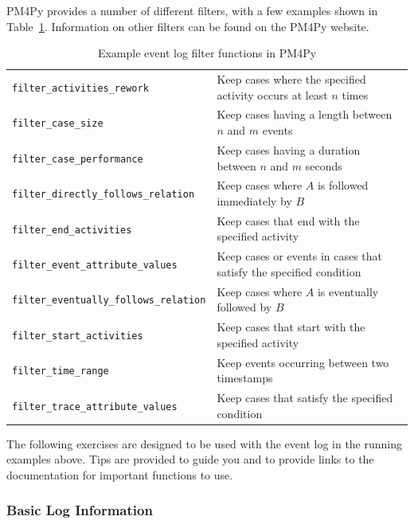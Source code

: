 \begin{withcode}
PM4Py provides a number of different filters, with a few examples shown in Table~\ref{tab:pm4py_filters}. Information on other filters can be found on the PM4Py website.

\begin{table}
\small
\renewcommand{\arraystretch}{1.25}
\begin{tabularx}{\textwidth}{l|X} \hline 
\texttt{filter\_activities\_rework} & Keep cases where the specified activity occurs at least $n$ times \\
\texttt{filter\_case\_size} & Keep cases having a length between $n$ and $m$ events \\
\texttt{filter\_case\_performance} & Keep cases having a duration between $n$ and $m$ seconds \\
\texttt{filter\_directly\_follows\_relation} & Keep cases where $A$ is followed immediately by $B$ \\
\texttt{filter\_end\_activities} & Keep cases that end with the specified activity \\
\texttt{filter\_event\_attribute\_values} & Keep cases or events in cases that satisfy the specified condition \\ 
\texttt{filter\_eventually\_follows\_relation} & Keep cases where $A$ is eventually followed by $B$ \\
\texttt{filter\_start\_activities} & Keep cases that start with the specified activity \\
\texttt{filter\_time\_range} & Keep events occurring between two timestamps \\
\texttt{filter\_trace\_attribute\_values} & Keep cases that satisfy the specified condition \\ \hline
\end{tabularx}
\caption{Example event log filter functions in PM4Py}
\label{tab:pm4py_filters}
\end{table}


The following exercises are designed to be used with the event log in the running examples above. Tips are provided to guide you and to provide links to the documentation for important functions to use.

\begin{exerciseboxcomputer}

\subsubsection*{Basic Log Information}


\end{exerciseboxcomputer}
\end{withcode}
